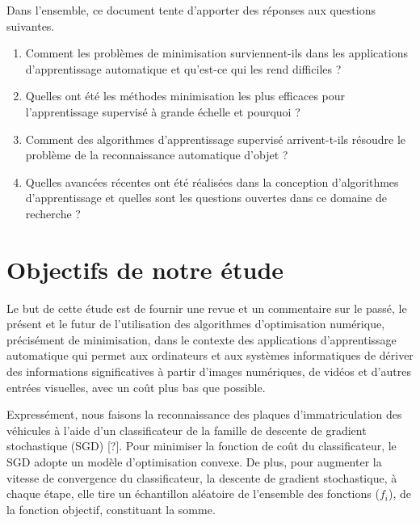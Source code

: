 		Dans l'ensemble, ce document tente d'apporter des réponses aux questions suivantes.
		\begin{enumerate}
			\item Comment les problèmes de minimisation surviennent-ils dans les applications d'apprentissage automatique et qu'est-ce qui les rend difficiles ?
			\item Quelles ont été les méthodes minimisation les plus efficaces pour l'apprentissage supervisé à grande échelle et pourquoi ?
			\item Comment des algorithmes d'apprentissage supervisé arrivent-t-ils résoudre le problème de la reconnaissance automatique d'objet ?
			\item Quelles avancées récentes ont été réalisées dans la conception d'algorithmes d'apprentissage et quelles sont les questions ouvertes dans ce domaine de recherche ?
		\end{enumerate}
		
		
	
	\section{Objectifs de notre étude}
		
		Le but de cette étude est de fournir une revue et un commentaire sur le passé, le présent et le futur de l'utilisation des algorithmes d'optimisation numérique, précisément de minimisation, dans le contexte des applications d'apprentissage automatique qui permet aux ordinateurs et aux systèmes informatiques de dériver des informations significatives à partir d'images numériques, de vidéos et d'autres entrées visuelles, avec un coût plus bas que possible. 
		
		Expressément, nous faisons la reconnaissance des plaques d’immatriculation des véhicules à l'aide d’un classificateur de la famille de descente de gradient stochastique (SGD) [?]. Pour minimiser la fonction de coût du classificateur, le SGD adopte un modèle d'optimisation convexe. De plus, pour augmenter la vitesse de convergence du classificateur, la descente de gradient stochastique, à chaque étape, elle tire un échantillon aléatoire de l'ensemble des fonctions ($f_i$), de la fonction objectif, constituant la somme.
		
